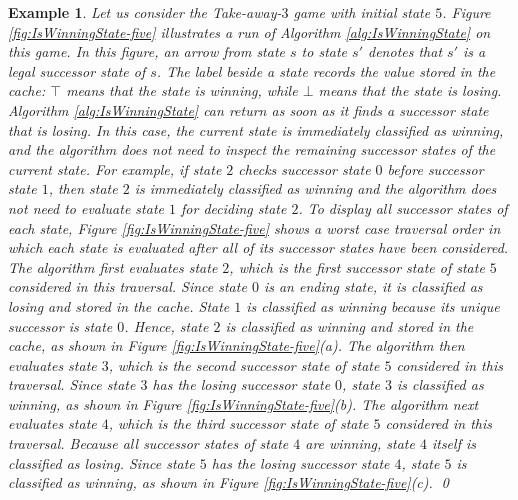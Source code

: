 \documentclass[review]{elsarticle}
\newcommand{\true}{\top}
\newcommand{\false}{\bot}
\newtheorem{example}{Example}
\begin{document}
				\begin{example}\label{exm:IsWinningState} \rm
						Let us consider the Take-away-$3$ game with initial state $5$.
						Figure \ref{fig:IsWinningState-five} illustrates a run of Algorithm \ref{alg:IsWinningState} on this game.
						In this figure, an arrow from state $s$ to state $s'$ denotes that $s'$ is a legal successor state of $s$.
						The label beside a state records the value stored in the cache: $\boldsymbol{\true}$ means that the state is winning, while $\boldsymbol{\false}$ means that the state is losing.
					Algorithm \ref{alg:IsWinningState} can return as soon as it finds a successor state that is losing.
					In this case, the current state is immediately classified as winning, and the algorithm does not need to inspect the remaining successor states of the current state.
						For example, if state $2$ checks successor state $0$ before successor state $1$, then state $2$ is immediately classified as winning and the algorithm does not need to evaluate state $1$ for deciding state $2$.
						To display all successor states of each state, Figure \ref{fig:IsWinningState-five} shows a worst case traversal order in which each state is evaluated after all of its successor states have been considered.
						The algorithm first evaluates state $2$, which is the first successor state of state $5$ considered in this traversal.
						Since state $0$ is an ending state, it is classified as losing and stored in the cache.
						State $1$ is classified as winning because its unique successor is state $0$.
						Hence, state $2$ is classified as winning and stored in the cache, as shown in Figure \ref{fig:IsWinningState-five}(a).
						The algorithm then evaluates state $3$, which is the second successor state of state $5$ considered in this traversal.
						Since state $3$ has the losing successor state $0$, state $3$ is classified as winning, as shown in Figure \ref{fig:IsWinningState-five}(b).
						The algorithm next evaluates state $4$, which is the third successor state of state $5$ considered in this traversal.
						Because all successor states of state $4$ are winning, state $4$ itself is classified as losing.
						Since state $5$ has the losing successor state $4$, state $5$ is classified as winning, as shown in Figure \ref{fig:IsWinningState-five}(c). \qed					
    	\end{example}
\end{document}

